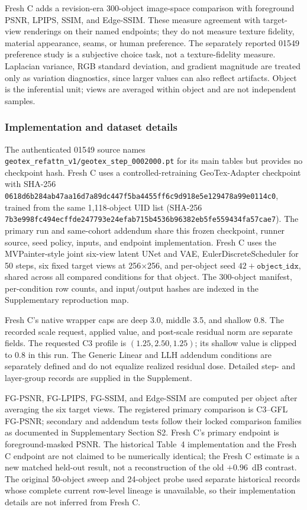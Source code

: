 \documentclass[times,twocolumn,final]{elsarticle}
\begin{document}
Fresh C adds a revision-era 300-object image-space comparison with foreground PSNR, LPIPS, SSIM, and Edge-SSIM. These measure agreement with target-view renderings on their named endpoints; they do not measure texture fidelity, material appearance, seams, or human preference. The separately reported 01549 preference study is a subjective choice task, not a texture-fidelity measure. Laplacian variance, RGB standard deviation, and gradient magnitude are treated only as variation diagnostics, since larger values can also reflect artifacts. Object is the inferential unit; views are averaged within object and are not independent samples.

\subsubsection{Implementation and dataset details}

The authenticated 01549 source names \texttt{geotex\_refattn\_v1/geotex\_step\_0002000.pt} for its main tables but provides no checkpoint hash. Fresh C uses a controlled-retraining GeoTex-Adapter checkpoint with SHA-256 \texttt{0618d6b2\allowbreak{}84ab47aa\allowbreak{}16d7a89d\allowbreak{}c447f5ba\allowbreak{}4455ff6c\allowbreak{}9d918e5e\allowbreak{}129478a9\allowbreak{}9e0114c0}, trained from the same 1,118-object UID list (SHA-256 \texttt{7b3e998f\allowbreak{}c494ecff\allowbreak{}de247793\allowbreak{}e24efab7\allowbreak{}15b4536b\allowbreak{}96382eb5\allowbreak{}fe559434\allowbreak{}fa57cae7}). The primary run and same-cohort addendum share this frozen checkpoint, runner source, seed policy, inputs, and endpoint implementation. Fresh C uses the MVPainter-style joint six-view latent UNet and VAE, EulerDiscreteScheduler for 50 steps, six fixed target views at 256$\times$256, and per-object seed $42+\texttt{object\_idx}$, shared across all compared conditions for that object. The 300-object manifest, per-condition row counts, and input/output hashes are indexed in the Supplementary reproduction map.

Fresh C's native wrapper caps are deep 3.0, middle 3.5, and shallow 0.8. The recorded scale request, applied value, and post-scale residual norm are separate fields. The requested C3 profile is $(1.25,2.50,1.25)$; its shallow value is clipped to 0.8 in this run. The Generic Linear and LLH addendum conditions are separately defined and do not equalize realized residual dose. Detailed step- and layer-group records are supplied in the Supplement.

FG-PSNR, FG-LPIPS, FG-SSIM, and Edge-SSIM are computed per object after averaging the six target views. The registered primary comparison is C3--GFL FG-PSNR; secondary and addendum tests follow their locked comparison families as documented in Supplementary Section S2. Fresh C's primary endpoint is foreground-masked PSNR. The historical Table~4 implementation and the Fresh C endpoint are not claimed to be numerically identical; the Fresh C estimate is a new matched held-out result, not a reconstruction of the old $+0.96$~dB contrast. The original 50-object sweep and 24-object probe used separate historical records whose complete current row-level lineage is unavailable, so their implementation details are not inferred from Fresh C.
\end{document}
